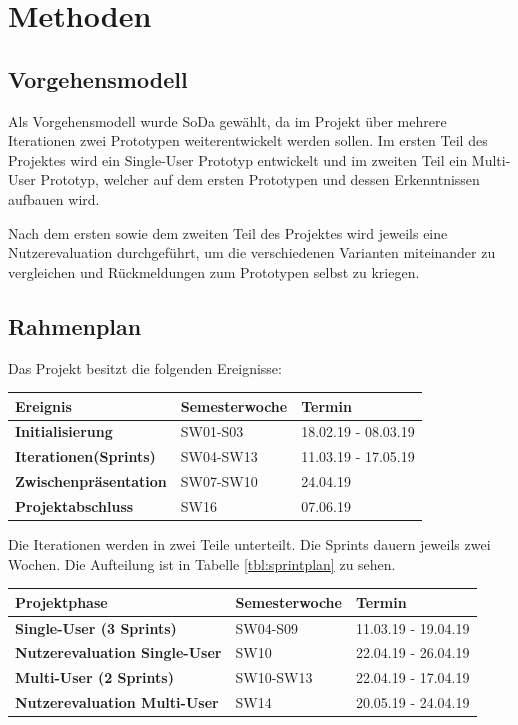 \chapter{Methoden}
\label{ch:Methoden}

\section{Vorgehensmodell}
Als Vorgehensmodell wurde SoDa gewählt, da im Projekt über mehrere Iterationen zwei Prototypen weiterentwickelt werden sollen. Im ersten Teil des Projektes wird ein Single-User Prototyp entwickelt und im zweiten Teil ein Multi-User Prototyp, welcher auf dem ersten Prototypen und dessen Erkenntnissen aufbauen wird.

\noindent Nach dem ersten sowie dem zweiten Teil des Projektes wird jeweils eine Nutzerevaluation durchgeführt, um die verschiedenen Varianten miteinander zu vergleichen und Rückmeldungen zum Prototypen selbst zu kriegen.

\section{Rahmenplan}
Das Projekt besitzt die folgenden Ereignisse:
\begin{center}
	\begin{tabular}	{ |l|l|l| }
		\hline
		\rowcolor{black}
		\color{white} \textbf{Ereignis} & \color{white} \textbf{Semesterwoche} & 
		\color{white} \textbf{Termin} \\
		\hline
		\textbf{Initialisierung} & SW01-S03 & 18.02.19 - 08.03.19 \\
		\hline
		\textbf{Iterationen(Sprints)} & SW04-SW13 & 11.03.19 - 17.05.19 \\
		\hline
		\textbf{Zwischenpräsentation} & SW07-SW10 & 24.04.19 \\
		\hline
		\textbf{Projektabschluss} & SW16 & 07.06.19 \\
		\hline		
	\end{tabular}
\end{center}
\label{tbl:rahmenplan}

\bigskip
Die Iterationen werden in zwei Teile unterteilt. Die Sprints dauern jeweils zwei Wochen. Die Aufteilung ist in Tabelle \ref{tbl:sprintplan} zu sehen.
\begin{center}
	\begin{tabular}	{ |l|l|l| }
		\hline
		\rowcolor{black}
		\color{white} \textbf{Projektphase} & \color{white} \textbf{Semesterwoche} & 
		\color{white} \textbf{Termin} \\
		\hline
		\textbf{Single-User (3 Sprints)} & SW04-S09 & 11.03.19 - 19.04.19 \\
		\hline
		\textbf{Nutzerevaluation Single-User} & SW10 & 22.04.19 - 26.04.19 \\
		\hline
		\textbf{Multi-User (2 Sprints)} & SW10-SW13 & 22.04.19 - 17.04.19\\
		\hline
		\textbf{Nutzerevaluation Multi-User} & SW14 & 20.05.19 - 24.04.19 \\
		\hline		
	\end{tabular}
\end{center}
\label{tbl:sprintplan}

